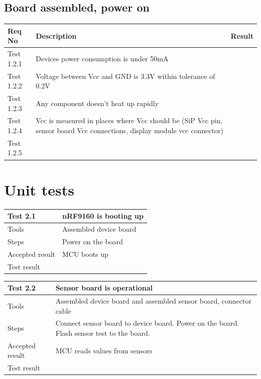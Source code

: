 \documentclass[]{dithesis}
\begin{document}
\subsection{Board assembled, power on}

\begin{tabular}{| m{2cm} | m{10cm} | m{2.5cm} |}
\hline
\textbf{Req No} & \textbf{Description} & \textbf{Result}  \\
\hline
Test 1.2.1 & Devices power consumption is under 50mA &  \\
\hline
Test 1.2.2 & Voltage between Vcc and GND is 3.3V within tolerance of 0.2V &   \\
\hline
Test 1.2.3 & Any component doesn't heat up rapidly &  \\
\hline
Test 1.2.4 & Vcc is measured in places where Vcc should be (SiP Vcc pin, sensor board Vcc connections, display module vcc connector) & \\
\hline
Test 1.2.5 & & \\
\hline
\end{tabular}

\section{Unit tests}

\begin{tabular}{| m{3cm} | m{12cm} | }
\hline
\textbf{Test 2.1} & \textbf{nRF9160 is booting up}  \\
\hline
Tools & Assembled device board   \\
\hline
Steps & Power on the board  \\
\hline
Accepted result & MCU boots up \\
\hline
Test result & \\
\hline
\end{tabular}

\bigskip

\begin{tabular}{| m{3cm} | m{12cm} | }
\hline
\textbf{Test 2.2} & \textbf{Sensor board is operational}  \\
\hline
Tools & Assembled device board and assembled sensor board, connector cable   \\
\hline
Steps & Connect sensor board to device board. Power on the board. Flash sensor test to the board.\\
\hline
Accepted result & MCU reads values from sensors \\
\hline
Test result & \\
\hline
\end{tabular}
\end{document}
